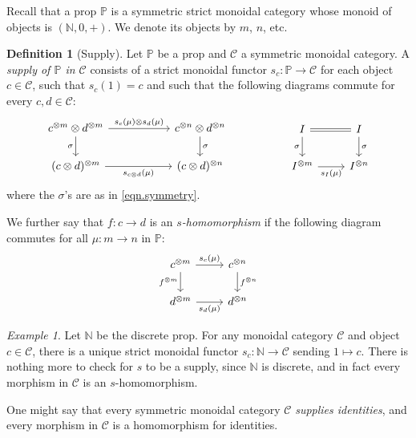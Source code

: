 \documentclass[11pt, oneside, article]{memoir}
\theoremstyle{plain}
\theoremstyle{definition}
\newtheorem{definition}[theorem]{Definition}
\theoremstyle{remark}
\newtheorem{example}[theorem]{Example}
\newcommand{\cat}[1]{\mathcal{#1}}%
\newcommand{\tpow}[1]{^{\otimes #1}}
\newcommand{\nn}{\mathbb{N}}
\newcommand{\pp}{\mathbb{P}}
\begin{document}
Recall that a prop $\pp$ is a symmetric strict monoidal category whose monoid of objects is $(\nn,0,+)$. We denote its objects by $m$, $n$, etc.

\begin{definition}[Supply]\label{def.supply}
Let $\pp$ be a prop and $\cat{C}$ a symmetric monoidal category. A \emph{supply of $\pp$ in $\cat{C}$} consists of a strict monoidal functor $s_c\colon\pp\to\cat{C}$ for each object $c\in\cat{C}$, such that $s_c(1)=c$ and such that the following diagrams commute for every $c,d\in\cat{C}$:
\begin{equation}\label{eqn.supply_commute_tensors}
\begin{tikzcd}[column sep=55pt]
	c\tpow{m}\otimes d\tpow{m}\ar[r, "s_c(\mu)\otimes s_d(\mu)"]\ar[d, "\sigma"']&
	c\tpow{n}\otimes d\tpow{n}\ar[d, "\sigma"]\\
	(c\otimes d)\tpow{m}\ar[r, "s_{c\otimes d}(\mu)"']&
	(c\otimes d)\tpow{n}
\end{tikzcd}
\hspace{.7in}
\begin{tikzcd}
	I\ar[r, equal]\ar[d, "\sigma"']&
	I\ar[d, "\sigma"]\\
	I\tpow{m}\ar[r, "s_I(\mu)"']&
	I\tpow{n}
\end{tikzcd}
\end{equation}
where the $\sigma$'s are as in \cref{eqn.symmetry}.
\end{definition}

We further say that $f\colon c\to d$ is an \emph{$s$-homomorphism} if the following diagram commutes for all $\mu\colon m\to n$ in $\pp$:
\begin{equation}\label{eqn.nat_means_homo}
\begin{tikzcd}
	c\tpow{m}\ar[r, "s_c(\mu)"]\ar[d, "f\tpow{m}"']&
	c\tpow{n}\ar[d, "f\tpow{n}"]\\
	d\tpow{m}\ar[r, "s_d(\mu)"']&
	d\tpow{n}
\end{tikzcd}
\end{equation}

\begin{example}\label{ex.supply_ids}
Let $\nn$ be the discrete prop. For any monoidal category $\cat{C}$ and object $c\in\cat{C}$, there is a unique strict monoidal functor $s_c\colon\nn\to\cat{C}$ sending $1\mapsto c$. There is nothing more to check for $s$ to be a supply, since $\nn$ is discrete, and in fact every morphism in $\cat{C}$ is an $s$-homomorphism. 

One might say that every symmetric monoidal category $\cat{C}$ \emph{supplies identities}, and every morphism in $\cat{C}$ is a homomorphism for identities.
\end{example}
\end{document}
